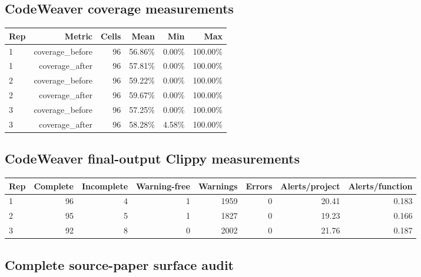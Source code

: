 \documentclass{article}
\begin{document}
\subsection*{CodeWeaver coverage measurements}

\begin{tabular}{lrrrrr}
\toprule
Rep & Metric & Cells & Mean & Min & Max \\
\midrule
1 & coverage\_before & 96 & 56.86\% & 0.00\% & 100.00\% \\
1 & coverage\_after & 96 & 57.81\% & 0.00\% & 100.00\% \\
2 & coverage\_before & 96 & 59.22\% & 0.00\% & 100.00\% \\
2 & coverage\_after & 96 & 59.67\% & 0.00\% & 100.00\% \\
3 & coverage\_before & 96 & 57.25\% & 0.00\% & 100.00\% \\
3 & coverage\_after & 96 & 58.28\% & 4.58\% & 100.00\% \\
\bottomrule
\end{tabular}

\subsection*{CodeWeaver final-output Clippy measurements}

\begin{tabular}{lrrrrrrr}
\toprule
Rep & Complete & Incomplete & Warning-free & Warnings & Errors & Alerts/project & Alerts/function \\
\midrule
1 & 96 & 4 & 1 & 1959 & 0 & 20.41 & 0.183 \\
2 & 95 & 5 & 1 & 1827 & 0 & 19.23 & 0.166 \\
3 & 92 & 8 & 0 & 2002 & 0 & 21.76 & 0.187 \\
\bottomrule
\end{tabular}

\subsection*{Complete source-paper surface audit}
\end{document}
